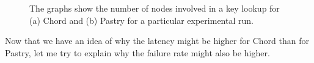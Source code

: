 \begin{figure}[htb]
  \centering
  \caption{The graphs show the number of nodes involved in a key lookup for (a) Chord and (b) Pastry for a particular experimental run.}
\end{figure}

\mbox{}
Now that we have an idea of why the latency might be higher for Chord than for Pastry, let me try to explain why the failure rate might also be higher.

